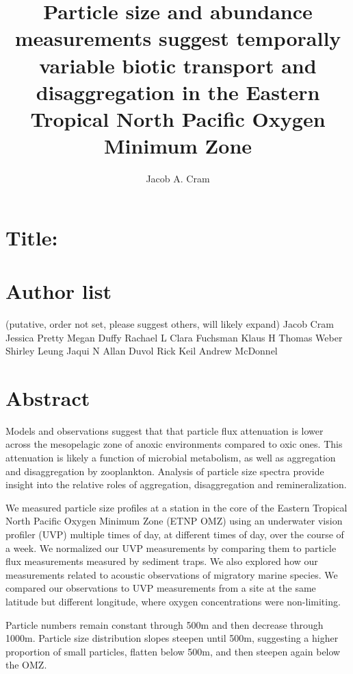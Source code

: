 \documentclass[]{article}
\title{Particle size and abundance measurements suggest temporally variable
biotic transport and disaggregation in the Eastern Tropical North
Pacific Oxygen Minimum Zone}
\author{Jacob A. Cram}
\date{}
\begin{document}
\maketitle

\hypertarget{title}{%
\section{Title:}\label{title}}

\hypertarget{author-list}{%
\section{Author list}\label{author-list}}

(putative, order not set, please suggest others, will likely expand)
Jacob Cram Jessica Pretty Megan Duffy Rachael L Clara Fuchsman Klaus H
Thomas Weber Shirley Leung Jaqui N Allan Duvol Rick Keil Andrew McDonnel

\hypertarget{abstract}{%
\section{Abstract}\label{abstract}}

Models and observations suggest that that particle flux attenuation is
lower across the mesopelagic zone of anoxic environments compared to
oxic ones. This attenuation is likely a function of microbial
metabolism, as well as aggregation and disaggregation by zooplankton.
Analysis of particle size spectra provide insight into the relative
roles of aggregation, disaggregation and remineralization.

We measured particle size profiles at a station in the core of the
Eastern Tropical North Pacific Oxygen Minimum Zone (ETNP OMZ) using an
underwater vision profiler (UVP) multiple times of day, at different
times of day, over the course of a week. We normalized our UVP
measurements by comparing them to particle flux measurements measured by
sediment traps. We also explored how our measurements related to
acoustic observations of migratory marine species. We compared our
observations to UVP measurements from a site at the same latitude but
different longitude, where oxygen concentrations were non-limiting.

Particle numbers remain constant through 500m and then decrease through
1000m. Particle size distribution slopes steepen until 500m, suggesting
a higher proportion of small particles, flatten below 500m, and then
steepen again below the OMZ.
\end{document}
